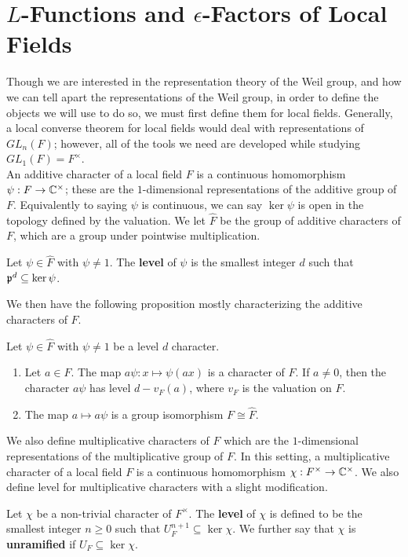 \section{$L$-Functions and $\epsilon$-Factors of Local Fields}
\label{sec:Leps-LF}
Though we are interested in the representation theory of the Weil group, and how we can tell apart the representations of the Weil group, in order to define the objects we will use to do so, we must first define them for local fields.
Generally, a local converse theorem for local fields would deal with representations of $GL_n(F)$; however, all of the tools we need are developed while studying $GL_1(F) = F^\times$.\\

An additive character of a local field $F$ is a continuous homomorphism $\psi: F \to \mathbb{C}^\times$; these are the $1$-dimensional representations of the additive group of $F$.
Equivalently to saying $\psi$ is continuous, we can say $\ker \psi$ is open in the topology defined by the valuation.
We let $\hat{F}$ be the group of additive characters of $F$, which are a group under pointwise multiplication.
\begin{defn}
  Let $\psi \in \hat{F}$ with $\psi \neq 1$.
  The \textbf{level} of $\psi$ is the smallest integer $d$ such that $\mathfrak{p}^d \subseteq \ker \psi$.
\end{defn}
We then have the following proposition mostly characterizing the additive characters of $F$.
\begin{prop}
  Let $\psi \in \hat{F}$ with $\psi \neq 1$ be a level $d$ character.
  \begin{enumerate}
    \item Let $a \in F$. The map $a \psi : x \mapsto \psi(ax)$ is a character of $F$. If $a \neq 0$, then the character $a \psi$ has level $d - v_F(a)$, where $v_F$ is the valuation on $F$.
    \item The map $a \mapsto a \psi$ is a group isomorphism $F \cong \hat{F}$.
  \end{enumerate}
\end{prop}

We also define multiplicative characters of $F$ which are the $1$-dimensional representations of the multiplicative group of $F$.
In this setting, a multiplicative character of a local field $F$ is a continuous homomorphism $\chi : F^\times \to \mathbb{C}^\times$.
We also define level for multiplicative characters with a slight modification.
\begin{defn}
  Let $\chi$ be a non-trivial character of $F^\times$.
  The \textbf{level} of $\chi$ is defined to be the smallest integer $n \geq 0$ such that $U^{n+1}_F \subseteq \ker \chi$.
  We further say that $\chi$ is \textbf{unramified} if $U_F \subseteq \ker \chi$.
\end{defn}

